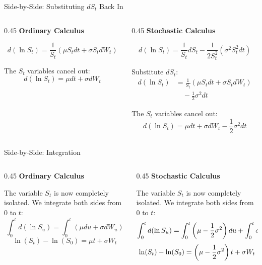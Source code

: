 \documentclass{beamer}
\begin{document}
\begin{frame}{Side-by-Side: Substituting $dS_t$ Back In}
\begin{columns}[T]
\begin{column}{0.45\textwidth}
\textbf{Ordinary Calculus}
\vspace{0.3cm}

\[ d(\ln S_t) = \frac{1}{S_t} (\mu S_t dt + \sigma S_t dW_t) \]

The $S_t$ variables cancel out:
\[ d(\ln S_t) = \mu dt + \sigma dW_t \]
\end{column}
\hfill\vrule\hfill
\begin{column}{0.45\textwidth}
\textbf{Stochastic Calculus}
\vspace{0.3cm}

\[ d(\ln S_t) = \frac{1}{S_t} dS_t - \frac{1}{2S_t^2} (\sigma^2 S_t^2 dt) \]

Substitute $dS_t$:
\begin{align*}
d(\ln S_t) &= \frac{1}{S_t}(\mu S_t dt + \sigma S_t dW_t) \\
&\quad - \frac{1}{2}\sigma^2 dt
\end{align*}

The $S_t$ variables cancel out:
\[ d(\ln S_t) = \mu dt + \sigma dW_t - \frac{1}{2}\sigma^2 dt \]
\end{column}
\end{columns}
\end{frame}

\begin{frame}{Side-by-Side: Integration}
\begin{columns}[T]
\begin{column}{0.45\textwidth}
\textbf{Ordinary Calculus}
\vspace{0.3cm}

The variable $S_t$ is now completely isolated. We integrate both sides from $0$ to $t$:
\[ \int_0^t d(\ln S_u) = \int_0^t (\mu du + \sigma dW_u) \]
\[ \ln(S_t) - \ln(S_0) = \mu t + \sigma W_t \]
\end{column}
\hfill\vrule\hfill
\begin{column}{0.45\textwidth}
\textbf{Stochastic Calculus}
\vspace{0.3cm}

The variable $S_t$ is now completely isolated. We integrate both sides from $0$ to $t$:
\[ \int_0^t d(\ln S_u) = \int_0^t \left(\mu - \frac{1}{2}\sigma^2\right) du 

\hfill + \int_0^t \sigma dW_u \]
\[ \ln(S_t) - \ln(S_0) = \left(\mu - \frac{1}{2}\sigma^2\right)t 

\hfill \hfill + \sigma W_t \]
\end{column}
\end{columns}
\end{frame}
\end{document}
